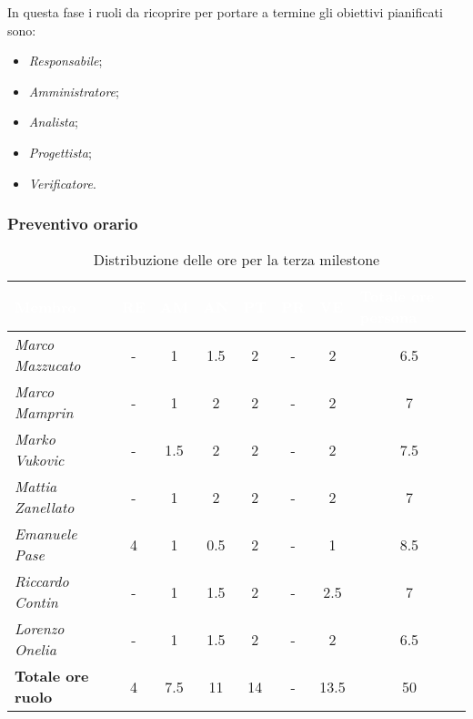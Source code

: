 In questa fase i ruoli da ricoprire per portare a termine gli obiettivi
pianificati sono:
\begin{itemize}
    \item \textit{Responsabile};
    \item \textit{Amministratore};
    \item \textit{Analista};
    \item \textit{Progettista};
    \item \textit{Verificatore}.
\end{itemize}

\subsubsection{Preventivo orario}

\begin{table}[H]
    \renewcommand\arraystretch{1.5}
    \centering
    \begin{tabular}{|l|c|c|c|c|c|c|c|}
    \hline
    \rowcolor[HTML]{036400}
    \textcolor{white}{\textbf{Membro}} & \multicolumn{1}{l|}{\textcolor{white}{\textbf{RE}}} & \multicolumn{1}{l|}{\textcolor{white}{\textbf{AM}}} & \multicolumn{1}{l|}{\textcolor{white}{\textbf{AN}}} & \multicolumn{1}{l|}{\textcolor{white}{\textbf{PT}}} & \multicolumn{1}{l|}{\textcolor{white}{\textbf{PR}}} & \multicolumn{1}{l|}{\textcolor{white}{\textbf{VE}}} & \multicolumn{1}{l|}{\textcolor{white}{\textbf{Totale ore persona}}} \\ \hline
    \rowcolor[HTML]{EFEFEF}\textit{Marco Mazzucato}  & - & 1   & 1.5 & 2 & -  & 2    & 6.5  \\ \hline
    \rowcolor[HTML]{C0C0C0}\textit{Marco Mamprin}    & - & 1   & 2   & 2 & -  & 2    & 7    \\ \hline
    \rowcolor[HTML]{EFEFEF}\textit{Marko Vukovic}    & - & 1.5 & 2   & 2 & -  & 2    & 7.5  \\ \hline
    \rowcolor[HTML]{C0C0C0}\textit{Mattia Zanellato} & - & 1   & 2   & 2 & -  & 2    & 7    \\ \hline
    \rowcolor[HTML]{EFEFEF}\textit{Emanuele Pase}    & 4 & 1   & 0.5 & 2 & -  & 1    & 8.5  \\ \hline
    \rowcolor[HTML]{C0C0C0}\textit{Riccardo Contin}  & - & 1   & 1.5 & 2 & -  & 2.5  & 7    \\ \hline
    \rowcolor[HTML]{EFEFEF}\textit{Lorenzo Onelia}   & - & 1   & 1.5 & 2 & -  & 2    & 6.5  \\ \hline
    \rowcolor[HTML]{C0C0C0}\textbf{Totale ore ruolo} & 4 & 7.5 & 11  & 14& - & 13.5 & 50   \\ \hline
    \end{tabular}
    \caption{Distribuzione delle ore per la terza milestone}
\end{table}

